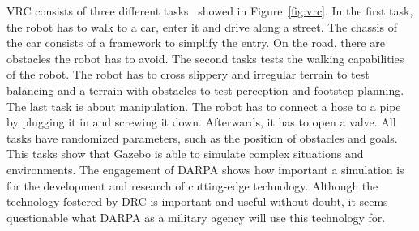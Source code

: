 VRC consists of three different tasks~\cite{vrc_rules} showed in Figure~\ref{fig:vrc}. In the first task, the robot has to walk to a car, enter it and drive along a street. The chassis of the car consists of a framework to simplify the entry. On the road, there are obstacles the robot has to avoid. The second tasks tests the walking capabilities of the robot. The robot has to cross slippery and irregular terrain to test balancing and a terrain with obstacles to test perception and footstep planning. The last task is about manipulation. The robot has to connect a hose to a pipe by plugging it in and screwing it down. Afterwards, it has to open a valve. All tasks have randomized parameters, such as the position of obstacles and goals. This tasks show that Gazebo is able to simulate complex situations and environments. The engagement of DARPA shows how important a simulation is for the development and research of cutting-edge technology. Although the technology fostered by DRC is important and useful without doubt, it seems questionable what DARPA as a military agency will use this technology for.


